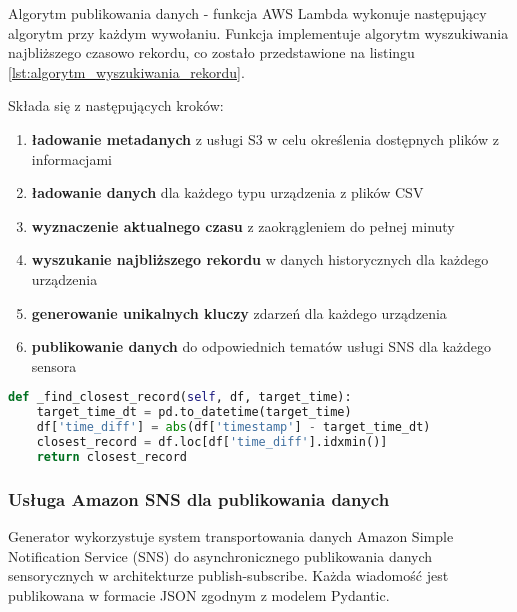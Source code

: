 Algorytm publikowania danych - funkcja AWS Lambda wykonuje następujący algorytm przy każdym wywołaniu. Funkcja implementuje algorytm wyszukiwania najbliższego czasowo rekordu, co zostało przedstawione na listingu \ref{lst:algorytm_wyszukiwania_rekordu}. 

\vspace{0.3em}

Składa się z następujących kroków:

\begin{enumerate}
    \item \textbf{ładowanie metadanych} z usługi S3 w celu określenia dostępnych plików z informacjami
    \item \textbf{ładowanie danych} dla każdego typu urządzenia z plików CSV
    \item \textbf{wyznaczenie aktualnego czasu} z zaokrągleniem do pełnej minuty
    \item \textbf{wyszukanie najbliższego rekordu} w danych historycznych dla każdego urządzenia
    \item \textbf{generowanie unikalnych kluczy} zdarzeń dla każdego urządzenia
    \item \textbf{publikowanie danych} do odpowiednich tematów usługi SNS dla każdego sensora
\end{enumerate}

\vspace{0.3em}

\begin{lstlisting}[language=Python, caption=Algorytm wyszukiwania najbliższego rekordu, label={lst:algorytm_wyszukiwania_rekordu}]
def _find_closest_record(self, df, target_time):
    target_time_dt = pd.to_datetime(target_time)
    df['time_diff'] = abs(df['timestamp'] - target_time_dt)
    closest_record = df.loc[df['time_diff'].idxmin()]
    return closest_record
\end{lstlisting}

\subsubsection{Usługa Amazon SNS dla publikowania danych}
\label{subsec:amazon_sns}

Generator wykorzystuje system transportowania danych Amazon Simple Notification Service (SNS) do asynchronicznego publikowania danych sensorycznych w architekturze publish-subscribe. Każda wiadomość jest publikowana w formacie JSON zgodnym z modelem Pydantic.

\vspace{0.3em}

